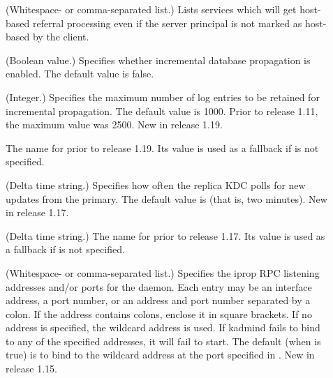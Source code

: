\documentclass[letterpaper,10pt,english]{sphinxmanual}
\begin{document}
\begin{description}
\item[{}] \leavevmode
(Whitespace- or comma-separated list.)  Lists services which will
get host-based referral processing even if the server principal is
not marked as host-based by the client.

\item[{}] \leavevmode
(Boolean value.)  Specifies whether incremental database
propagation is enabled.  The default value is false.

\item[{}] \leavevmode
(Integer.)  Specifies the maximum number of log entries to be
retained for incremental propagation.  The default value is 1000.
Prior to release 1.11, the maximum value was 2500.  New in release
1.19.

\item[{}] \leavevmode
The name for  prior to release 1.19.  Its value is
used as a fallback if  is not specified.

\item[{}] \leavevmode
(Delta time string.)  Specifies how often the replica KDC polls
for new updates from the primary.  The default value is 
(that is, two minutes).  New in release 1.17.

\item[{}] \leavevmode
(Delta time string.)  The name for  prior to
release 1.17.  Its value is used as a fallback if
 is not specified.

\item[{}] \leavevmode
(Whitespace- or comma-separated list.)  Specifies the iprop RPC
listening addresses and/or ports for the {\hyperref[\detokenize{admin/admin_commands/kadmind:kadmind-8}]{}} daemon.
Each entry may be an interface address, a port number, or an
address and port number separated by a colon.  If the address
contains colons, enclose it in square brackets.  If no address is
specified, the wildcard address is used.  If kadmind fails to bind
to any of the specified addresses, it will fail to start.  The
default (when  is true) is to bind to the wildcard
address at the port specified in .  New in release
1.15.


\end{description}
\end{document}
